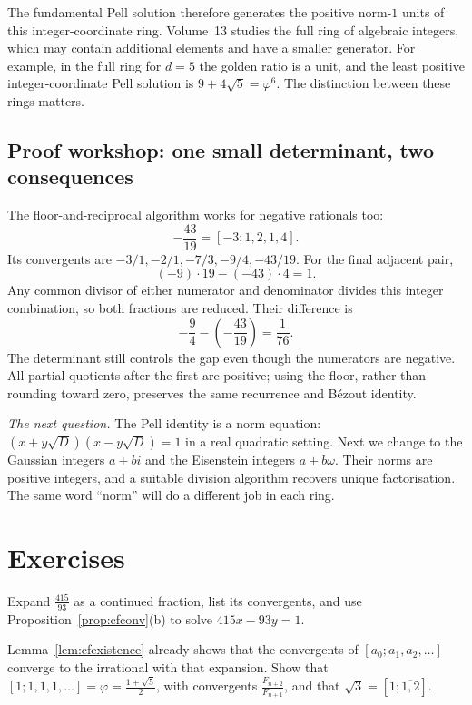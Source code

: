 \begin{beauty}
The fundamental Pell solution therefore generates the positive norm-$1$ units of this integer-coordinate ring. Volume~13 studies the full ring of algebraic integers, which may contain additional elements and have a smaller generator. For example, in the full ring for $d=5$ the golden ratio is a unit, and the least positive integer-coordinate Pell solution is $9+4\sqrt5=\varphi^6$. The distinction between these rings matters.
\end{beauty}

\subsection*{Proof workshop: one small determinant, two consequences}

The floor-and-reciprocal algorithm works for negative rationals too:
\[
-\frac{43}{19}=[-3;1,2,1,4].
\]
Its convergents are $-3/1,-2/1,-7/3,-9/4,-43/19$.
For the final adjacent pair,
\[
(-9)\cdot19-(-43)\cdot4=1.
\]
Any common divisor of either numerator and denominator divides this
integer combination, so both fractions are reduced. Their difference is
\[
-\frac94-\left(-\frac{43}{19}\right)=\frac1{76}.
\]
The determinant still controls the gap even though the numerators are
negative. All partial quotients after the first are positive; using the
floor, rather than rounding toward zero, preserves the same recurrence
and B\'ezout identity.


\medskip
\noindent\emph{The next question.} The Pell identity is a norm equation: $(x+y\sqrt D)(x-y\sqrt D)=1$ in a real quadratic setting. Next we change to the Gaussian integers $a+bi$ and the Eisenstein integers $a+b\omega$. Their norms are positive integers, and a suitable division algorithm recovers unique factorisation. The same word ``norm'' will do a different job in each ring.

\section{Exercises}

\begin{exercise}[$\star$]\label{ex:cf415}
Expand $\frac{415}{93}$ as a continued fraction, list its convergents, and use Proposition~\ref{prop:cfconv}(b) to solve $415x-93y=1$.
\end{exercise}

\begin{exercise}[$\star\star$]\label{ex:cfunique}
Lemma~\ref{lem:cfexistence} already shows that the convergents of $[a_0;a_1,a_2,\dots]$ converge to the irrational with that expansion. Show that $[1;1,1,1,\dots]=\varphi=\frac{1+\sqrt5}2$, with convergents $\frac{F_{n+2}}{F_{n+1}}$, and that $\sqrt3=[1;\overline{1,2}]$.
\end{exercise}

